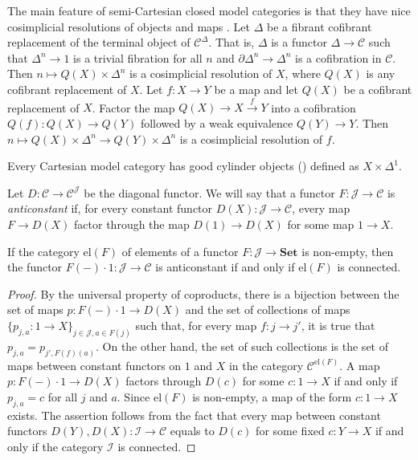 \documentclass[reqno]{amsart}
\theoremstyle{definition}
\theoremstyle{remark}
\newcommand{\fs}[1]{\mathrm{#1}}
\newcommand{\cat}[1]{\mathbf{#1}}
\newcommand{\scat}[1]{\mathcal{#1}}
\newcommand{\Set}{\cat{Set}}
\numberwithin{figure}{section}
\begin{document}
The main feature of semi-Cartesian closed model categories is that they have nice cosimplicial resolutions of objects and maps \cite[Definition~16.1.2, Definition~16.1.20]{hirschhorn}.
Let $\Delta$ be a fibrant cofibrant replacement of the terminal object of $\scat{C}^\Delta$.
That is, $\Delta$ is a functor $\Delta \to \scat{C}$ such that $\Delta^n \to 1$ is a trivial fibration for all $n$ and $\partial \Delta^n \to \Delta^n$ is a cofibration in $\scat{C}$.
Then $n \mapsto Q(X) \times \Delta^n$ is a cosimplicial resolution of $X$, where $Q(X)$ is any cofibrant replacement of $X$.
Let $f : X \to Y$ be a map and let $Q(X)$ be a cofibrant replacement of $X$.
Factor the map $Q(X) \to X \xrightarrow{f} Y$ into a cofibration $Q(f) : Q(X) \to Q(Y)$ followed by a weak equivalence $Q(Y) \to Y$.
Then $n \mapsto Q(X) \times \Delta^n \to Q(Y) \times \Delta^n$ is a cosimplicial resolution of $f$.

\begin{remark}
Every Cartesian model category has good cylinder objects () defined as $X \times \Delta^1$.
\end{remark}

Let $D : \scat{C} \to \scat{C}^\scat{J}$ be the diagonal functor.
We will say that a functor $F : \scat{J} \to \scat{C}$ is \emph{anticonstant} if, for every constant functor $D(X) : \scat{J} \to \scat{C}$, every map $F \to D(X)$ factor through the map $D(1) \to D(X)$ for some map $1 \to X$.

\begin{lem}
If the category $\fs{el}(F)$ of elements of a functor $F : \scat{J} \to \Set$ is non-empty, then the functor $F(-) \cdot 1 : \scat{J} \to \scat{C}$ is anticonstant if and only if $\fs{el}(F)$ is connected.
\end{lem}
\begin{proof}
By the universal property of coproducts, there is a bijection between the set of maps $p : F(-) \cdot 1 \to D(X)$ and the set of collections of maps $\{ p_{j,a} : 1 \to X \}_{j \in \scat{J}, a \in F(j)}$ such that,
for every map $f : j \to j'$, it is true that $p_{j,a} = p_{j',F(f)(a)}$.
On the other hand, the set of such collections is the set of maps between constant functors on $1$ and $X$ in the category $\scat{C}^{\fs{el}(F)}$.
A map $p : F(-) \cdot 1 \to D(X)$ factors through $D(c)$ for some $c : 1 \to X$ if and only if $p_{j,a} = c$ for all $j$ and $a$.
Since $\fs{el}(F)$ is non-empty, a map of the form $c : 1 \to X$ exists.
The assertion follows from the fact that every map between constant functors $D(Y), D(X) : \scat{I} \to \scat{C}$ equals to $D(c)$ for some fixed $c : Y \to X$ if and only if the category $\scat{I}$ is connected.
\end{proof}
\end{document}
